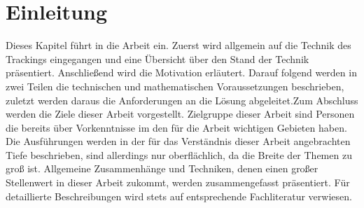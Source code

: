\documentclass[a4paper,11pt, twoside, openright]{scrbook}
\begin{document}
\frontmatter 









\tableofcontents 
%
\listoffigures
%
\listoftables
%
\lstlistoflistings
%

%


\mainmatter 
\chapter{Einleitung}
Dieses Kapitel führt in die Arbeit ein. Zuerst wird allgemein auf die Technik des Trackings eingegangen und eine Übersicht über den Stand der Technik präsentiert. Anschließend wird die Motivation erläutert. Darauf folgend werden in zwei Teilen die technischen und mathematischen Voraussetzungen beschrieben, zuletzt werden daraus die Anforderungen an die Lösung abgeleitet.Zum Abschluss werden die Ziele dieser Arbeit vorgestellt.
Zielgruppe dieser Arbeit sind Personen die bereits über Vorkenntnisse im den für die Arbeit wichtigen Gebieten haben. Die Ausführungen werden in der für das Verständnis dieser Arbeit angebrachten Tiefe beschrieben, sind allerdings nur oberflächlich, da die Breite der Themen zu groß ist. Allgemeine Zusammenhänge und Techniken, denen einen großer Stellenwert in dieser Arbeit zukommt, werden zusammengefasst präsentiert. Für detaillierte Beschreibungen wird stets auf entsprechende Fachliteratur verwiesen. 
%

%
\end{document}
